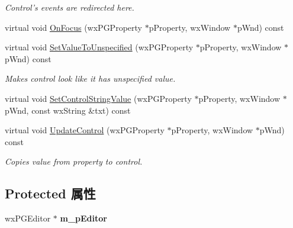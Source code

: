 \begin{DoxyCompactItemize}
\begin{DoxyCompactList}\small\item\em Control's events are redirected here. \end{DoxyCompactList}\item 
virtual void \hyperlink{classwx_p_g_custom_spin_ctrl_editor_a7f555e04d739f031cfd32b6daf6dadb9}{On\+Focus} (wx\+P\+G\+Property $\ast$p\+Property, wx\+Window $\ast$p\+Wnd) const 
\item 
\hypertarget{classwx_p_g_custom_spin_ctrl_editor_abdc86169d84355a619099fff488f5333}{virtual void \hyperlink{classwx_p_g_custom_spin_ctrl_editor_abdc86169d84355a619099fff488f5333}{Set\+Value\+To\+Unspecified} (wx\+P\+G\+Property $\ast$p\+Property, wx\+Window $\ast$p\+Wnd) const }\label{classwx_p_g_custom_spin_ctrl_editor_abdc86169d84355a619099fff488f5333}

\begin{DoxyCompactList}\small\item\em Makes control look like it has unspecified value. \end{DoxyCompactList}\item 
virtual void \hyperlink{classwx_p_g_custom_spin_ctrl_editor_aee1d6b10aa1184fffa33ab3dba22c30f}{Set\+Control\+String\+Value} (wx\+P\+G\+Property $\ast$p\+Property, wx\+Window $\ast$p\+Wnd, const wx\+String \&txt) const 
\item 
\hypertarget{classwx_p_g_custom_spin_ctrl_editor_ad04b89935535042f60df0d428fba4e73}{virtual void \hyperlink{classwx_p_g_custom_spin_ctrl_editor_ad04b89935535042f60df0d428fba4e73}{Update\+Control} (wx\+P\+G\+Property $\ast$p\+Property, wx\+Window $\ast$p\+Wnd) const }\label{classwx_p_g_custom_spin_ctrl_editor_ad04b89935535042f60df0d428fba4e73}

\begin{DoxyCompactList}\small\item\em Copies value from property to control. \end{DoxyCompactList}\end{DoxyCompactItemize}
\subsection*{Protected 属性}
\begin{DoxyCompactItemize}
\item 
\hypertarget{classwx_p_g_custom_spin_ctrl_editor_ade27c2a03bc15597ea44a827886aa69f}{wx\+P\+G\+Editor $\ast$ {\bfseries m\+\_\+p\+Editor}}\label{classwx_p_g_custom_spin_ctrl_editor_ade27c2a03bc15597ea44a827886aa69f}

\end{DoxyCompactItemize}



